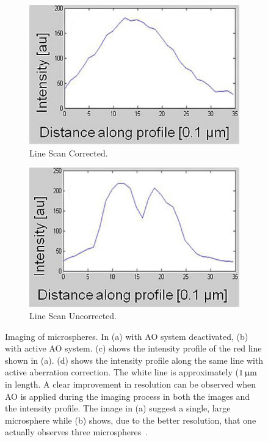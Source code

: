 \begin{figure}[htb]
        \begin{subfigure}[b]{0.25\textwidth}
                \includegraphics[width=\textwidth]{images/wide_direct_c}
                \caption{Line Scan Corrected.}
                \label{fig:wide_direct_c}
        \end{subfigure}
        \begin{subfigure}[b]{0.25\textwidth}
                \includegraphics[width=\textwidth]{images/wide_direct_d}
                \caption{Line Scan Uncorrected.}
                \label{fig:wide_direct_d}
        \end{subfigure}
								
        \caption{Imaging of microspheres. In (a) with AO system deactivated, (b) with active AO system. (c) shows the intensity profile of the red line shown in (a). (d) shows the intensity profile along the same line with active aberration correction. The white line is approximately ($\unit[1]{\upmu m}$ in length. A clear improvement in resolution can be observed when AO is applied during the imaging process in both the images and the intensity profile. The image in (a) suggest a single, large microsphere while (b) shows, due to the better resolution, that one actually observes three microspheres~\cite{wide_directSensing_microscope}.}
\label{fig:wide_direct_results}
\end{figure} 




